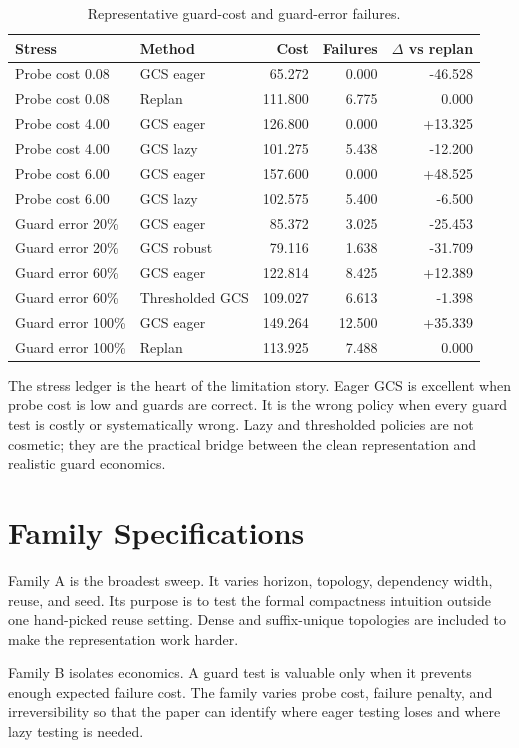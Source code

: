 \documentclass{article}
\begin{document}
\begin{table}[p]
\centering
\caption{Representative guard-cost and guard-error failures.}
\label{tab:failure-ledger}
\small
\begin{tabular}{llrrr}
\toprule
Stress & Method & Cost & Failures & $\Delta$ vs replan\\
\midrule
Probe cost 0.08 & GCS eager & 65.272 & 0.000 & -46.528\\
Probe cost 0.08 & Replan & 111.800 & 6.775 & 0.000\\
Probe cost 4.00 & GCS eager & 126.800 & 0.000 & +13.325\\
Probe cost 4.00 & GCS lazy & 101.275 & 5.438 & -12.200\\
Probe cost 6.00 & GCS eager & 157.600 & 0.000 & +48.525\\
Probe cost 6.00 & GCS lazy & 102.575 & 5.400 & -6.500\\
\midrule
Guard error 20\% & GCS eager & 85.372 & 3.025 & -25.453\\
Guard error 20\% & GCS robust & 79.116 & 1.638 & -31.709\\
Guard error 60\% & GCS eager & 122.814 & 8.425 & +12.389\\
Guard error 60\% & Thresholded GCS & 109.027 & 6.613 & -1.398\\
Guard error 100\% & GCS eager & 149.264 & 12.500 & +35.339\\
Guard error 100\% & Replan & 113.925 & 7.488 & 0.000\\
\bottomrule
\end{tabular}
\end{table}

The stress ledger is the heart of the limitation story. Eager GCS is excellent when probe cost is low and guards are correct. It is the wrong policy when every guard test is costly or systematically wrong. Lazy and thresholded policies are not cosmetic; they are the practical bridge between the clean representation and realistic guard economics.

\section{Family Specifications}
Family A is the broadest sweep. It varies horizon, topology, dependency width, reuse, and seed. Its purpose is to test the formal compactness intuition outside one hand-picked reuse setting. Dense and suffix-unique topologies are included to make the representation work harder.

Family B isolates economics. A guard test is valuable only when it prevents enough expected failure cost. The family varies probe cost, failure penalty, and irreversibility so that the paper can identify where eager testing loses and where lazy testing is needed.
\end{document}
